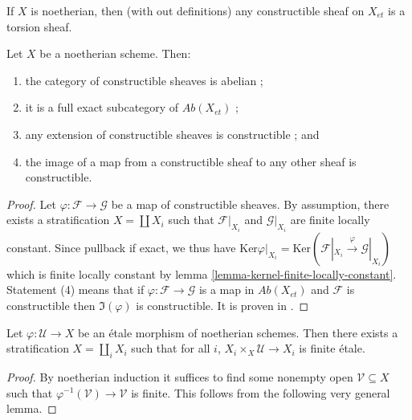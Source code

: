 \begin{remark}
\label{remark-noetherian-constructible-torsion}
If $X$ is noetherian, then (with out definitions)
any constructible sheaf on $X_{et}$ is a torsion sheaf.
\end{remark}

\begin{lemma}
\label{lemma-constructible-abelian}
Let $X$ be a noetherian scheme. Then:
\begin{enumerate}
\item the category of constructible sheaves is abelian ;
\item it is a full exact subcategory of $\textit{Ab}(X_{et})$ ;
\item any extension of constructible sheaves is constructible ; and
\item the image of a map from a constructible sheaf to any other sheaf
is constructible.
\end{enumerate}
\end{lemma}

\begin{proof}
Let $\varphi: \mathcal{F} \to \mathcal{G}$ be a map of constructible sheaves.
By assumption, there exists a stratification $X = \coprod X_i$ such that
$\mathcal{F}|_{X_i}$ and $\mathcal{G}|_{X_i}$ are finite locally constant.
Since pullback if exact, we thus have $\text{Ker} \varphi|_{X_i} = \text{Ker}
(\mathcal{F}|_{X_i}\xrightarrow{\varphi} \mathcal{G}|_{X_i})$ which is finite
locally constant by lemma \ref{lemma-kernel-finite-locally-constant}.
Statement (4) means that if $\varphi :\mathcal{F}\to\mathcal{G}$ is a map in
$\textit{Ab}(X_{et})$ and $\mathcal{F}$ is constructible then $\Im(\varphi)$ is
constructible. It is proven in \cite{SGA4.5}.
\end{proof}

\begin{lemma}
\label{lemma-etale-stratified-finite}
Let $\varphi: \mathcal{U} \to X$ be an \'etale morphism of noetherian schemes.
Then there exists a stratification $X=\coprod_i X_i$ such that for all $i$,
$X_i\times_X \mathcal{U} \to X_i$ is finite \'etale.
\end{lemma}

\begin{proof}
By noetherian induction it suffices to find some nonempty open
$\mathcal{V}\subseteq X$ such that $\varphi^{-1}(\mathcal{V})\to \mathcal{V}$
is finite. This follows from the following very general lemma.
\end{proof}

